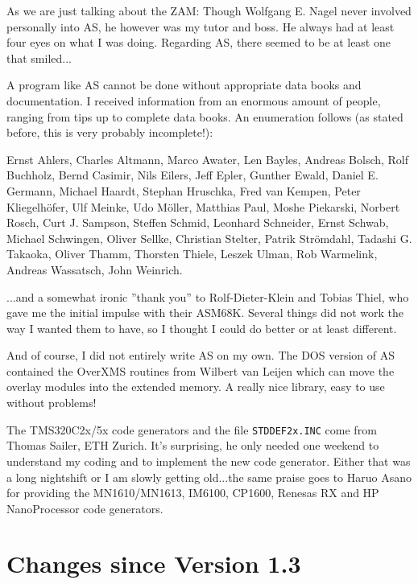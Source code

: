 \documentclass[12pt,twoside]{report}
\newcommand{\tty}[1]{{\tt #1}}
\newcommand{\asname}{{AS}}
\begin{document}
As we are just talking about the ZAM: Though Wolfgang E. Nagel never
involved personally into \asname{}, he however was my tutor and
boss.  He always had at least four eyes on what I was doing.
Regarding \asname{}, there seemed to be at least one that smiled...

A program like \asname{} cannot be done without appropriate data books and
documentation.  I received information from an enormous amount of
people, ranging from tips up to complete data books.  An enumeration
follows (as stated before, this is very probably incomplete!):

Ernst Ahlers, Charles Altmann, Marco Awater, Len Bayles, Andreas
Bolsch, Rolf Buchholz, Bernd Casimir, Nils Eilers, Jeff Epler, Gunther Ewald,
Daniel E. Germann, Michael Haardt, Stephan Hruschka, Fred van
Kempen, Peter Kliegelh\"ofer, Ulf Meinke, Udo M\"oller, Matthias
Paul, Moshe Piekarski, Norbert Rosch, Curt J.  Sampson, Steffen Schmid,
Leonhard Schneider, Ernst Schwab, Michael Schwingen, Oliver Sellke,
Christian Stelter, Patrik Str\"omdahl, Tadashi G. Takaoka,
Oliver Thamm, Thorsten Thiele, Leszek Ulman, Rob Warmelink,
Andreas Wassatsch, John Weinrich.

...and a somewhat ironic ''thank you'' to Rolf-Dieter-Klein and Tobias
Thiel, who gave me the initial impulse with their ASM68K.  Several things
did not work the way I wanted them to have, so I thought I could do
better or at least different.

And of course, I did not entirely write \asname{} on my own.  The DOS
version of \asname{} contained the OverXMS routines from Wilbert van
Leijen which can move the overlay modules into the extended memory.
A really nice library, easy to use without problems!

The TMS320C2x/5x code generators and the file \tty{STDDEF2x.INC} come
from Thomas Sailer, ETH Zurich.  It's surprising, he only needed one
weekend to understand my coding and to implement the new code
generator.  Either that was a long nightshift or I am slowly getting
old...the same praise goes to Haruo Asano for providing the
MN1610/MN1613, IM6100, CP1600, Renesas RX and HP NanoProcessor code
generators.


\cleardoublepage
\chapter{Changes since Version 1.3}
\end{document}
